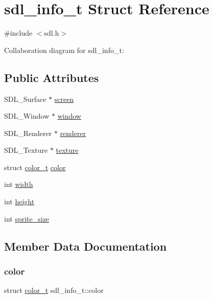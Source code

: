 \hypertarget{structsdl__info__t}{}\section{sdl\+\_\+info\+\_\+t Struct Reference}
\label{structsdl__info__t}


{\ttfamily \#include $<$sdl.\+h$>$}



Collaboration diagram for sdl\+\_\+info\+\_\+t\+:
\subsection*{Public Attributes}
\begin{DoxyCompactItemize}
\item 
S\+D\+L\+\_\+\+Surface $\ast$ \hyperlink{structsdl__info__t_ace88dc90952d64264b8f8ceedc5f1847}{screen}
\item 
S\+D\+L\+\_\+\+Window $\ast$ \hyperlink{structsdl__info__t_ae06510785e8d9ca03a6371aef2b908fa}{window}
\item 
S\+D\+L\+\_\+\+Renderer $\ast$ \hyperlink{structsdl__info__t_a76af8f5f73014164c54775b91d6a66ce}{renderer}
\item 
S\+D\+L\+\_\+\+Texture $\ast$ \hyperlink{structsdl__info__t_a0c62b9f6687072b1e255ad27dc3db919}{texture}
\item 
struct \hyperlink{structcolor__t}{color\+\_\+t} \hyperlink{structsdl__info__t_a793e548fc0386a76cdee71647bd096d4}{color}
\item 
int \hyperlink{structsdl__info__t_a347a3ae7f67b70ba5542d434f7d4dc8b}{width}
\item 
int \hyperlink{structsdl__info__t_ae23e8fb74d99bcd74a3f121aafdf2831}{height}
\item 
int \hyperlink{structsdl__info__t_ab25151bb7aded0b292222bcddb8314e1}{sprite\+\_\+size}
\end{DoxyCompactItemize}


\subsection{Member Data Documentation}
\mbox{\label{structsdl__info__t_a793e548fc0386a76cdee71647bd096d4}} 
\subsubsection{\texorpdfstring{color}{color}}
{\footnotesize\ttfamily struct \hyperlink{structcolor__t}{color\+\_\+t} sdl\+\_\+info\+\_\+t\+::color}

